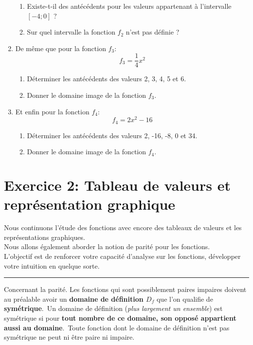 \documentclass[11pt, french]{article}
\begin{document}
\begin{enumerate}
\begin{enumerate}
       \item Existe-t-il des antécédents pour les valeurs appartenant à l'intervalle $[-4 ; 0]$ ?
       \item Sur quel intervalle la fonction $f_2$ n'est pas définie ?
    \end{enumerate}
    \item De même que pour la fonction $f_3$:
    \begin{equation*}
        f_3 = \frac{1}{4}x^2
    \end{equation*}
    \begin{enumerate}
       \item Déterminer les antécédents des valeurs 2, 3, 4, 5 et 6.
       \item Donner le domaine image de la fonction $f_3$.
    \end{enumerate}
    \item Et enfin pour la fonction $f_4$:
    \begin{equation*}
        f_4 = 2x^2 - 16
    \end{equation*}
    \begin{enumerate}
       \item Déterminer les antécédents des valeurs 2, -16, -8, 0 et 34.
       \item Donner le domaine image de la fonction $f_4$.
    \end{enumerate}
\end{enumerate}
\vspace{2cm}

\section*{Exercice 2: Tableau de valeurs et représentation graphique}
Nous continuons l'étude des fonctions avec encore des tableaux de valeurs et les représentations graphiques.\\
Nous allons également aborder la notion de parité pour les fonctions.\\
L'objectif est de renforcer votre capacité d'analyse sur les fonctions, développer votre intuition en quelque sorte.

\noindent\rule{\textwidth}{1pt}
Concernant la parité.
Les fonctions qui sont possiblement paires impaires doivent au préalable avoir un \textbf{domaine de définition $D_f$} que l'on qualifie de \textbf{symétrique}.\
Un domaine de définition (\textit{plus largement un ensemble}) est symétrique si pour \textbf{tout nombre de ce domaine, son opposé appartient aussi au domaine}.\
Toute fonction dont le domaine de définition n'est pas symétrique ne peut ni être paire ni impaire.\
\end{document}
